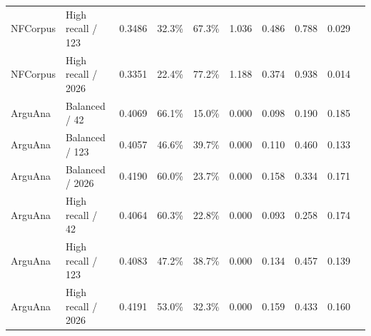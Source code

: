 \begin{table}[!htbp]
\begin{tabular}{llrrrrrrrr}
NFCorpus & High recall / 123 & 0.3486 & 32.3\% & 67.3\% & 1.036 & 0.486 & 0.788 & 0.029 \\
NFCorpus & High recall / 2026 & 0.3351 & 22.4\% & 77.2\% & 1.188 & 0.374 & 0.938 & 0.014 \\
\midrule
ArguAna & Balanced / 42 & 0.4069 & 66.1\% & 15.0\% & 0.000 & 0.098 & 0.190 & 0.185 \\
ArguAna & Balanced / 123 & 0.4057 & 46.6\% & 39.7\% & 0.000 & 0.110 & 0.460 & 0.133 \\
ArguAna & Balanced / 2026 & 0.4190 & 60.0\% & 23.7\% & 0.000 & 0.158 & 0.334 & 0.171 \\
ArguAna & High recall / 42 & 0.4064 & 60.3\% & 22.8\% & 0.000 & 0.093 & 0.258 & 0.174 \\
ArguAna & High recall / 123 & 0.4083 & 47.2\% & 38.7\% & 0.000 & 0.134 & 0.457 & 0.139 \\
ArguAna & High recall / 2026 & 0.4191 & 53.0\% & 32.3\% & 0.000 & 0.159 & 0.433 & 0.160 \\
\bottomrule
\end{tabular}
\end{table}

